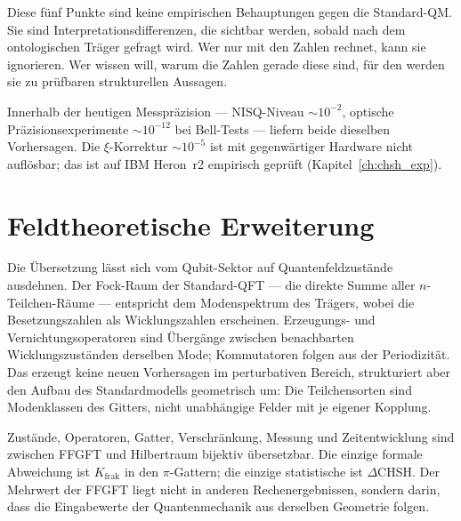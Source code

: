 Diese fünf Punkte sind keine empirischen Behauptungen gegen die
Standard-QM. Sie sind Interpretationsdifferenzen, die sichtbar werden,
sobald nach dem ontologischen Träger gefragt wird. Wer nur mit den Zahlen
rechnet, kann sie ignorieren. Wer wissen will, warum die Zahlen gerade
diese sind, für den werden sie zu prüfbaren strukturellen Aussagen.

Innerhalb der heutigen Messpräzision --- NISQ-Niveau $\sim10^{-2}$,
optische Präzisionsexperimente $\sim10^{-12}$ bei Bell-Tests --- liefern
beide dieselben Vorhersagen. Die $\xi$-Korrektur $\sim10^{-5}$ ist mit
gegenwärtiger Hardware nicht auflösbar; das ist auf IBM Heron~r2
empirisch geprüft (Kapitel~\ref{ch:chsh_exp}).

\section{Feldtheoretische Erweiterung}

Die Übersetzung lässt sich vom Qubit-Sektor auf Quantenfeldzustände
ausdehnen. Der Fock-Raum der Standard-QFT --- die direkte Summe aller
$n$-Teilchen-Räume --- entspricht dem Modenspektrum des Trägers, wobei
die Besetzungszahlen als Wicklungszahlen erscheinen. Erzeugungs- und
Vernichtungsoperatoren sind Übergänge zwischen benachbarten
Wicklungszuständen derselben Mode; Kommutatoren folgen aus der
Periodizität. Das erzeugt keine neuen Vorhersagen im perturbativen
Bereich, strukturiert aber den Aufbau des Standardmodells geometrisch um:
Die Teilchensorten sind Modenklassen des Gitters, nicht unabhängige
Felder mit je eigener Kopplung.

\begin{keypoint}
Zustände, Operatoren, Gatter, Verschränkung, Messung und Zeitentwicklung
sind zwischen FFGFT und Hilbertraum bijektiv übersetzbar. Die einzige
formale Abweichung ist $K_{\mathrm{frak}}$ in den $\pi$-Gattern; die
einzige statistische ist $\Delta$CHSH. Der Mehrwert der FFGFT liegt nicht
in anderen Rechenergebnissen, sondern darin, dass die Eingabewerte der
Quantenmechanik aus derselben Geometrie folgen.
\end{keypoint}

